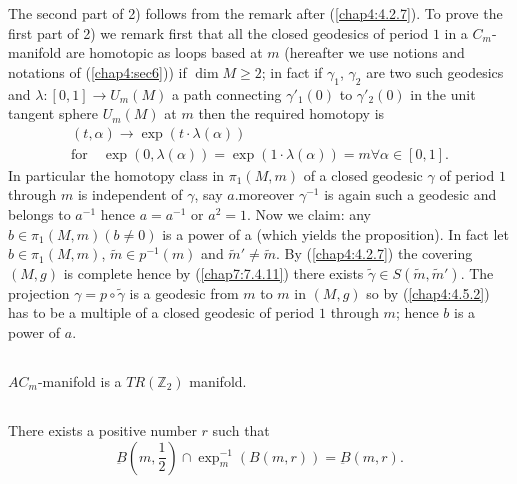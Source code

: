 The \pageoriginale second part of 2) follows from the remark after
(\ref{chap4:4.2.7}). To prove the first part of 2) we remark first that
all the closed geodesics of period $1$ in a $C_{m}$-manifold are
homotopic as loops based at $m$ (hereafter we use notions and
notations of (\ref{chap4:sec6})) if $\dim M\geq 2$; in fact if $\gamma_{1}$,
$\gamma_{2}$ are two such geodesics and $\lambda:[0,1]\to U_{m}(M)$ a
path connecting $\gamma'_{1}(0)$ to $\gamma'_{2}(0)$ in the unit
tangent sphere $U_{m}(M)$ at $m$ then the required homotopy is
\begin{gather*}
(t,\alpha)\to \exp (t\cdot\lambda(\alpha))\\
\text{for}\quad
\exp(0,\lambda(\alpha))=\exp(1\cdot\lambda(\alpha))=m\forall \alpha\in [0,1].
\end{gather*}
In particular the homotopy class in $\pi_{1}(M,m)$ of a closed
geodesic $\gamma$ of period $1$ through $m$ is independent of
$\gamma$, say $a$.\@ moreover $\gamma^{-1}$ is again such a geodesic
and belongs to $a^{-1}$ hence $a=a^{-1}$ or $a^{2}=1$. Now we claim:
any $b\in \pi_{1}(M,m)(b\neq 0)$ is a power of a (which yields the
proposition). In fact let $b\in\pi_{1}(M,m)$, $\widetilde{m}\in
p^{-1}(m)$ and $\widetilde{m}'\neq \widetilde{m}$. By
(\ref{chap4:4.2.7}) the covering $(M,g)$ is complete hence by
(\ref{chap7:7.4.11}) there exists $\widetilde{\gamma}\in
S(\widetilde{m},\widetilde{m}')$. The projection
$\gamma=p\circ\widetilde{\gamma}$ is a geodesic from $m$ to $m$ in
$(M,g)$ so by (\ref{chap4:4.5.2}) has to be a multiple of a closed
geodesic of period $1$ through $m$; hence $b$ is a power of $a$.

\subsection{}\label{chap4:4.6.6}

\begin{theorem*}[H. Samelson.]
$AC_{m}$-manifold is a $TR(\mathbb{Z}_{2})$ manifold.
\end{theorem*}

\subsection{}\label{chap4:4.6.7}


\begin{lemma*}
There exists a positive number $r$ such that
$$
\underbar{B}(m,\frac{1}{2})\cap \exp^{-1}_{m}(B(m,r))=\underbar{B}(m,r).
$$
\end{lemma*}

